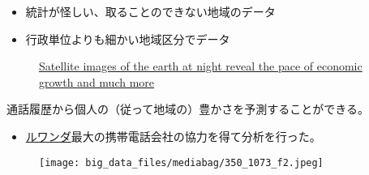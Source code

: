 \documentclass[
  xelatex,
  ja=standard]{bxjsarticle}
\providecommand{\tightlist}{%
  \setlength{\itemsep}{0pt}\setlength{\parskip}{0pt}}\usepackage{longtable,booktabs,array}
\begin{document}
\begin{itemize}
\tightlist
\item
  統計が怪しい、取ることのできない地域のデータ
\item
  行政単位よりも細かい地域区分でデータ
\end{itemize}

\begin{figure}

\begin{minipage}[t]{0.50\linewidth}

{\centering 


}

\end{minipage}%
%
\begin{minipage}[t]{0.50\linewidth}

{\centering 


}

\end{minipage}%
\newline
\begin{minipage}[t]{0.50\linewidth}

{\centering 

\href{https://www.imf.org/en/Publications/fandd/issues/2019/09/satellite-images-at-night-and-economic-growth-yao}{Satellite
images of the earth at night reveal the pace of economic growth and much
more}

}

\end{minipage}%

\end{figure}

通話履歴から個人の（従って地域の）豊かさを予測することができる。

\begin{itemize}
\tightlist
\item
  \href{https://ict4d.jp/2017/07/01/mobile-poverty/}{ルワンダ}最大の携帯電話会社の協力を得て分析を行った。
\end{itemize}

\begin{figure}[htpb]

{\centering \texttt{[image: big\_data\_files/mediabag/350\_1073\_f2.jpeg]}

}

\caption{\citet{blumenstock2015}}

\end{figure}
\end{document}
